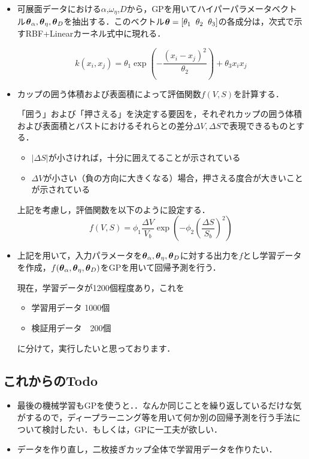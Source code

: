 \documentclass[11pt]{jsarticle}
\begin{document}
			\begin{itemize}
				\item 可展面データにおける$ \alpha $,$ \omega_{\eta} $,$ D $から，GPを用いてハイパーパラメータベクトル$ \boldsymbol{\theta}_{\alpha},\boldsymbol{\theta}_{\eta},\boldsymbol{\theta}_{D} $を抽出する．このベクトル$ \boldsymbol{\theta} = [\theta_1 \;\; \theta_2 \;\; \theta_3] $の各成分は，次式で示すRBF+Linearカーネル式中に現れる．
				
				\begin{equation}\label{eq:RBFLinear}
					k(x_i,x_j) = \theta_1 \exp \left( -\frac{(x_i-x_j)^2}{\theta_2} \right) + \theta_3 x_i x_j
				\end{equation}
				
				\item カップの囲う体積および表面積によって評価関数$ f(V,S) $を計算する．
				
				「囲う」および「押さえる」を決定する要因を，それぞれカップの囲う体積および表面積とバストにおけるそれらとの差分$\Delta V,\Delta S $で表現できるものとする．
				\begin{itemize}
					\item $ |\Delta S| $が小さければ，十分に囲えてることが示されている
					\item $ \Delta V $が小さい（負の方向に大きくなる）場合，押さえる度合が大きいことが示されている
				\end{itemize}
				上記を考慮し，評価関数を以下のように設定する．
				\begin{equation}\label{eq:EvalFunc}
					f(V,S) = \phi_1 \frac{\Delta V}{V_b} \exp \left(-\phi_2 \left(\frac{\Delta S}{S_b}\right)^2 \right)
				\end{equation}
				
				\item 上記を用いて，入力パラメータを$ \boldsymbol{\theta}_{\alpha},\boldsymbol{\theta}_{\eta},\boldsymbol{\theta}_{D} $に対する出力を$ f $とし学習データを作成，$ f(\boldsymbol{\theta}_{\alpha},\boldsymbol{\theta}_{\eta},\boldsymbol{\theta}_{D}) $をGPを用いて回帰予測を行う．
				
				現在，学習データが1200個程度あり，これを
				\begin{itemize}
					\item 学習用データ 1000個
					\item 検証用データ　200個
				\end{itemize}
			に分けて，実行したいと思っております．
			\end{itemize}
		\subsection{これからのTodo}
			\begin{itemize}
				\item 最後の機械学習もGPを使うと．．なんか同じことを繰り返しているだけな気がするので，ディープラーニング等を用いて何か別の回帰予測を行う手法について検討したい．もしくは，GPに一工夫が欲しい．
				\item データを作り直し，二枚接ぎカップ全体で学習用データを作りたい．
			\end{itemize}
			
	\newpage
\vspace{10cm}

\vspace{14cm}
	\articleSPRfour
	\articleSPRfive
\end{document}

